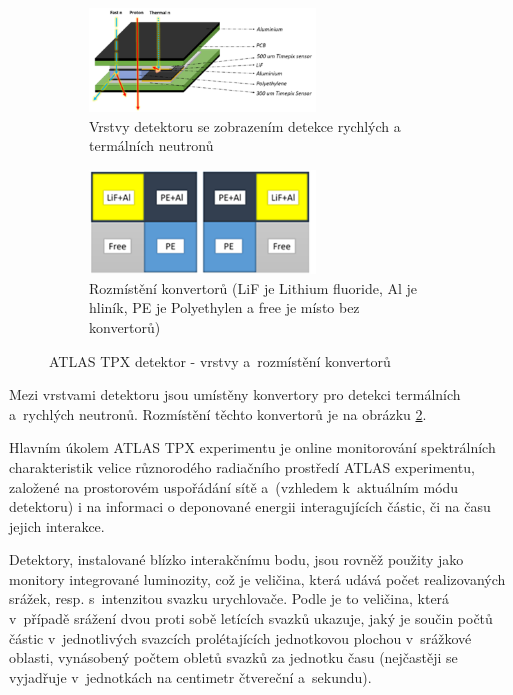 \begin{figure}[th]
	\begin{center}
		\begin{subfigure}{6cm}
			\includegraphics[width=6cm]{figures/tpx_lay.png}	
			\caption{Vrstvy detektoru se zobrazením detekce rychlých a termálních neutronů}
			\label{fig:tpx_detector_layers}
		\end{subfigure}
		\hspace{0.5cm}
		\begin{subfigure}{6cm}
			\includegraphics[width=6cm]{figures/tpx_conv.png}
			\caption{Rozmístění konvertorů (LiF je Lithium fluoride, Al je hliník, PE je Polyethylen a free je místo bez konvertorů)}
			\label{fig:tpx_detector_convertors}
		\end{subfigure}
		\caption{ATLAS TPX detektor - vrstvy a~rozmístění konvertorů}
		\label{fig:tpx_detector}
	\end{center}			
\end{figure}

Mezi vrstvami detektoru jsou umístěny konvertory pro detekci termálních a~rychlých neutronů. Rozmístění těchto konvertorů je na obrázku \ref{fig:tpx_detector_convertors}.

Hlavním úkolem ATLAS TPX experimentu je online monitorování spektrálních charakteristik velice různorodého radiačního prostředí ATLAS experimentu, založené na prostorovém uspořádání sítě a~(vzhledem k~aktuálním módu detektoru) i na informaci o deponované energii interagujících částic, či na času jejich interakce. 


Detektory, instalované blízko interakčnímu bodu, jsou rovněž použity jako monitory integrované luminozity, což je veličina, která udává počet realizovaných srážek, resp. s~intenzitou svazku urychlovače. Podle \cite{wagner:o_lhc} je to veličina, která v~případě srážení dvou proti sobě letících svazků ukazuje, jaký je součin počtů částic v~jednotlivých svazcích prolétajících jednotkovou plochou v~srážkové oblasti, vynásobený počtem obletů svazků za jednotku času (nejčastěji se vyjadřuje v~jednotkách na centimetr čtvereční a~sekundu).

